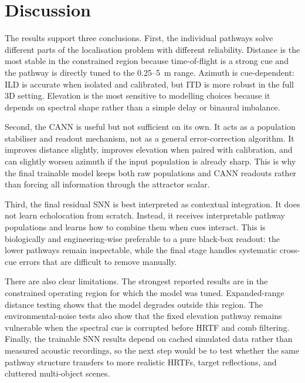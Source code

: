 \section{Discussion}

The results support three conclusions. First, the individual pathways solve different parts of the localisation problem with different reliability. Distance is the most stable in the constrained region because time-of-flight is a strong cue and the pathway is directly tuned to the 0.25--5~m range. Azimuth is cue-dependent: ILD is accurate when isolated and calibrated, but ITD is more robust in the full 3D setting. Elevation is the most sensitive to modelling choices because it depends on spectral shape rather than a simple delay or binaural imbalance.

Second, the CANN is useful but not sufficient on its own. It acts as a population stabiliser and readout mechanism, not as a general error-correction algorithm. It improves distance slightly, improves elevation when paired with calibration, and can slightly worsen azimuth if the input population is already sharp. This is why the final trainable model keeps both raw populations and CANN readouts rather than forcing all information through the attractor scalar.

Third, the final residual SNN is best interpreted as contextual integration. It does not learn echolocation from scratch. Instead, it receives interpretable pathway populations and learns how to combine them when cues interact. This is biologically and engineering-wise preferable to a pure black-box readout: the lower pathways remain inspectable, while the final stage handles systematic cross-cue errors that are difficult to remove manually.

There are also clear limitations. The strongest reported results are in the constrained operating region for which the model was tuned. Expanded-range distance testing shows that the model degrades outside this region. The environmental-noise tests also show that the fixed elevation pathway remains vulnerable when the spectral cue is corrupted before HRTF and comb filtering. Finally, the trainable SNN results depend on cached simulated data rather than measured acoustic recordings, so the next step would be to test whether the same pathway structure transfers to more realistic HRTFs, target reflections, and cluttered multi-object scenes.
